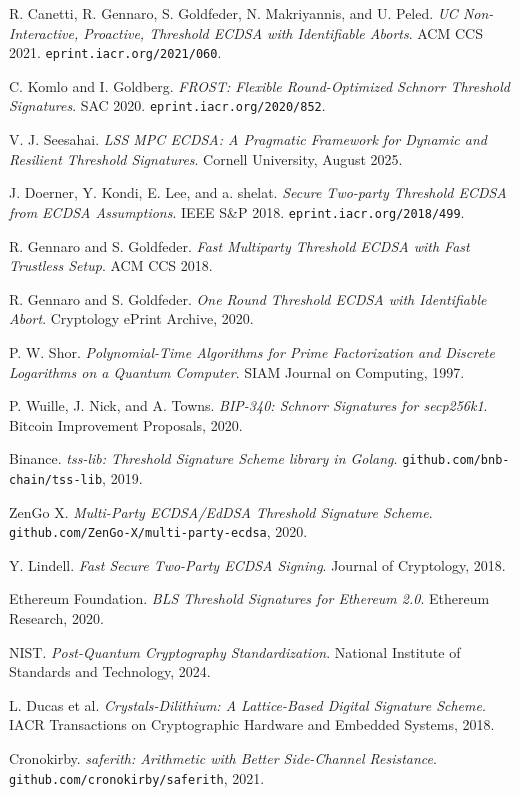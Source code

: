 \documentclass[11pt,twocolumn]{article}
\begin{document}

\begin{thebibliography}{99}

R. Canetti, R. Gennaro, S. Goldfeder, N. Makriyannis, and U. Peled.
\textit{UC Non-Interactive, Proactive, Threshold ECDSA with Identifiable Aborts}.
ACM CCS 2021. \texttt{eprint.iacr.org/2021/060}.

C. Komlo and I. Goldberg.
\textit{FROST: Flexible Round-Optimized Schnorr Threshold Signatures}.
SAC 2020. \texttt{eprint.iacr.org/2020/852}.

V. J. Seesahai.
\textit{LSS MPC ECDSA: A Pragmatic Framework for Dynamic and Resilient Threshold Signatures}.
Cornell University, August 2025.

J. Doerner, Y. Kondi, E. Lee, and a. shelat.
\textit{Secure Two-party Threshold ECDSA from ECDSA Assumptions}.
IEEE S\&P 2018. \texttt{eprint.iacr.org/2018/499}.

R. Gennaro and S. Goldfeder.
\textit{Fast Multiparty Threshold ECDSA with Fast Trustless Setup}.
ACM CCS 2018.

R. Gennaro and S. Goldfeder.
\textit{One Round Threshold ECDSA with Identifiable Abort}.
Cryptology ePrint Archive, 2020.

P. W. Shor.
\textit{Polynomial-Time Algorithms for Prime Factorization and Discrete Logarithms on a Quantum Computer}.
SIAM Journal on Computing, 1997.

P. Wuille, J. Nick, and A. Towns.
\textit{BIP-340: Schnorr Signatures for secp256k1}.
Bitcoin Improvement Proposals, 2020.

Binance.
\textit{tss-lib: Threshold Signature Scheme library in Golang}.
\texttt{github.com/bnb-chain/tss-lib}, 2019.

ZenGo X.
\textit{Multi-Party ECDSA/EdDSA Threshold Signature Scheme}.
\texttt{github.com/ZenGo-X/multi-party-ecdsa}, 2020.

Y. Lindell.
\textit{Fast Secure Two-Party ECDSA Signing}.
Journal of Cryptology, 2018.

Ethereum Foundation.
\textit{BLS Threshold Signatures for Ethereum 2.0}.
Ethereum Research, 2020.

NIST.
\textit{Post-Quantum Cryptography Standardization}.
National Institute of Standards and Technology, 2024.

L. Ducas et al.
\textit{Crystals-Dilithium: A Lattice-Based Digital Signature Scheme}.
IACR Transactions on Cryptographic Hardware and Embedded Systems, 2018.

Cronokirby.
\textit{saferith: Arithmetic with Better Side-Channel Resistance}.
\texttt{github.com/cronokirby/saferith}, 2021.

\end{thebibliography}
\end{document}
